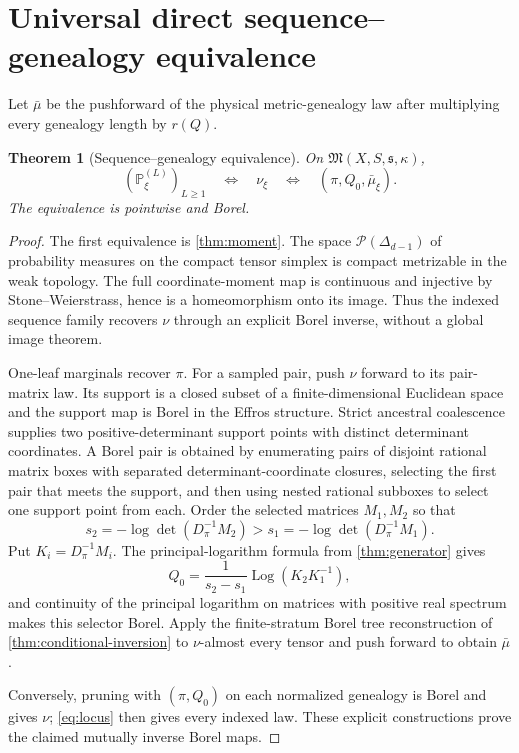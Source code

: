 \documentclass[11pt]{article}
\newtheorem{theorem}{Theorem}[section]
\newcommand{\cP}{\mathcal P}
\begin{document}
\section{Universal direct sequence--genealogy equivalence}
\label{sec:bridge}

Let $\bar\mu$ be the pushforward of the physical metric-genealogy law after multiplying every genealogy length by $r(Q)$.

\begin{theorem}[Sequence--genealogy equivalence]
\label{thm:bridge}
On $\mathfrak M(X,S,\mathfrak s,\kappa)$,
\begin{equation}
(\mathbb P_\xi^{(L)})_{L\ge1}
\quad\Longleftrightarrow\quad
\nu_\xi
\quad\Longleftrightarrow\quad
(\pi,Q_0,\bar\mu_\xi).
\label{eq:bridge}
\end{equation}
The equivalence is pointwise and Borel.
\end{theorem}

\begin{proof}
The first equivalence is \cref{thm:moment}.  The space $\cP(\Delta_{d-1})$ of probability measures on the compact tensor simplex is compact metrizable in the weak topology.  The full coordinate-moment map is continuous and injective by Stone--Weierstrass, hence is a homeomorphism onto its image.  Thus the indexed sequence family recovers $\nu$ through an explicit Borel inverse, without a global image theorem.

One-leaf marginals recover $\pi$.  For a sampled pair, push $\nu$ forward to its pair-matrix law.  Its support is a closed subset of a finite-dimensional Euclidean space and the support map is Borel in the Effros structure.  Strict ancestral coalescence supplies two positive-determinant support points with distinct determinant coordinates.  A Borel pair is obtained by enumerating pairs of disjoint rational matrix boxes with separated determinant-coordinate closures, selecting the first pair that meets the support, and then using nested rational subboxes to select one support point from each.  Order the selected matrices $M_1,M_2$ so that
\[
s_2=-\log\det(D_\pi^{-1}M_2)>s_1=-\log\det(D_\pi^{-1}M_1).
\]
Put $K_i=D_\pi^{-1}M_i$.  The principal-logarithm formula from \cref{thm:generator} gives
\[
Q_0=\frac{1}{s_2-s_1}\operatorname{Log}(K_2K_1^{-1}),
\]
and continuity of the principal logarithm on matrices with positive real spectrum makes this selector Borel.  Apply the finite-stratum Borel tree reconstruction of \cref{thm:conditional-inversion} to $\nu$-almost every tensor and push forward to obtain $\bar\mu$.

Conversely, pruning with $(\pi,Q_0)$ on each normalized genealogy is Borel and gives $\nu$; \eqref{eq:locus} then gives every indexed law.  These explicit constructions prove the claimed mutually inverse Borel maps.
\end{proof}
\end{document}
